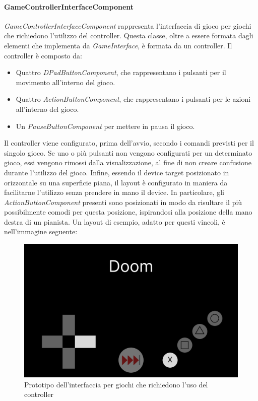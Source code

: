 \paragraph{GameControllerInterfaceComponent}
\label{paragraph:gamecontrollerinterfacecomponent}
\emph{GameControllerInterfaceComponent} rappresenta l'interfaccia di gioco per giochi che richiedono l'utilizzo del controller.
Questa classe, oltre a essere formata dagli elementi che implementa da \emph{GameInterface}, è formata da un controller. Il controller è composto da:
\begin{itemize}
    \item Quattro \emph{DPadButtonComponent}, che rappresentano i pulsanti per il movimento all'interno del gioco.
    \item Quattro \emph{ActionButtonComponent}, che rappresentano i pulsanti per le azioni\\ all'interno del gioco.
    \item Un \emph{PauseButtonComponent} per mettere in pausa il gioco.
\end{itemize}
Il controller viene configurato, prima dell'avvio, secondo i comandi previsti per il singolo gioco. Se uno o più pulsanti non vengono configurati per un determinato gioco, essi vengono rimossi dalla visualizzazione, al fine di non creare confusione durante l'utilizzo del gioco.
Infine, essendo il device target posizionato in orizzontale su una superficie piana, il layout è configurato in maniera da facilitarne l'utilizzo senza prendere in mano il device.
In particolare, gli \emph{ActionButtonComponent} presenti sono posizionati in modo da risultare il più possibilmente comodi per questa posizione, ispirandosi alla posizione della mano destra di un pianista.
Un layout di esempio, adatto per questi vincoli, è nell'immagine seguente:
\begin{figure}[h]
    \centering
    \includegraphics[width=340pt]{images/prog/ControllerMockup.png}
    \caption{Prototipo dell'interfaccia per giochi che richiedono l'uso del controller}
    \label{fig:controller}
\end{figure}
